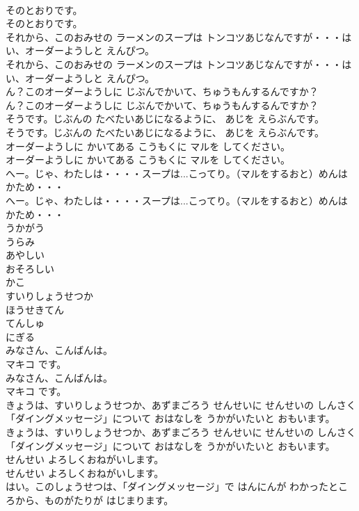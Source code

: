 \documentclass[8pt]{extreport}
\begin{document}
\begin{CJK}{UTF8}{min}
\\	そのとおりです。
\\	そのとおりです。
\\	それから、このおみせの ラーメンのスープは トンコツあじなんですが・・・はい、オーダーようしと えんぴつ。
\\	それから、このおみせの ラーメンのスープは トンコツあじなんですが・・・はい、オーダーようしと えんぴつ。
\\	ん？このオーダーようしに じぶんでかいて、ちゅうもんするんですか？
\\	ん？このオーダーようしに じぶんでかいて、ちゅうもんするんですか？
\\	そうです。じぶんの たべたいあじになるように、 あじを えらぶんです。
\\	そうです。じぶんの たべたいあじになるように、 あじを えらぶんです。
\\	オーダーようしに かいてある こうもくに マルを してください。
\\	オーダーようしに かいてある こうもくに マルを してください。
\\	へー。じゃ、わたしは・・・・スープは...こってり。（マルをするおと）めんは かため・・・
\\	へー。じゃ、わたしは・・・・スープは...こってり。（マルをするおと）めんは かため・・・
\\	うかがう
\\	うらみ
\\	あやしい
\\	おそろしい
\\	かこ
\\	すいりしょうせつか
\\	ほうせきてん
\\	てんしゅ
\\	にぎる
\\	みなさん、こんばんは。
\\	マキコ です。
\\	みなさん、こんばんは。
\\	マキコ です。
\\	きょうは、すいりしょうせつか、あずまごろう せんせいに せんせいの しんさく「ダイングメッセージ」について おはなしを うかがいたいと おもいます。
\\	きょうは、すいりしょうせつか、あずまごろう せんせいに せんせいの しんさく「ダイングメッセージ」について おはなしを うかがいたいと おもいます。
\\	せんせい よろしくおねがいします。
\\	せんせい よろしくおねがいします。
\\	はい。このしょうせつは、「ダイングメッセージ」で はんにんが わかったところから、ものがたりが はじまります。

\end{CJK}
\end{document}

